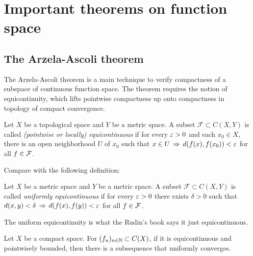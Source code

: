 \documentclass{../crs}
\begin{document}
\section{Important theorems on function space}

\subsection{The Arzela-Ascoli theorem}

The Arzela-Ascoli theorem is a main technique to verify compactness of a subspace of continuous function space.
The theorem requires the notion of equicontinuity, which lifts pointwise compactness up onto compactness in topology of compact convergence.

\begin{defn}
Let $X$ be a topological space and $Y$ be a metric space.
A subset $\mathcal{F}\subset C(X,Y)$ is called \emph{(pointwise or locally) equicontinuous} if for every $\varepsilon>0$ and each $x_0\in X$, there is an open neighborhood $U$ of $x_0$ such that $x\in U\impl d(f(x),f(x_0))<\e$ for all $f\in\mathcal{F}$.
\end{defn}
Compare with the following definition:
\begin{defn}
Let $X$ be a metric space and $Y$ be a metric space.
A subset $\mathcal{F}\subset C(X,Y)$ is called \emph{uniformly equicontinuous} if for every $\varepsilon>0$ there exists $\delta>0$ such that $d(x,y)<\delta\impl d(f(x),f(y))<\e$ for all $f\in\mathcal{F}$.
\end{defn}
The uniform equicontinuity is what the Rudin's book says it just equicontinuous.

\begin{thm}
Let $X$ be a compact space.
For $(f_n)_{n\in\mathbb{N}}\subset C(X)$, if it is equicontinuous and pointwisely bounded, then there is a subsequence that uniformly converges.
\end{thm}
\end{document}
